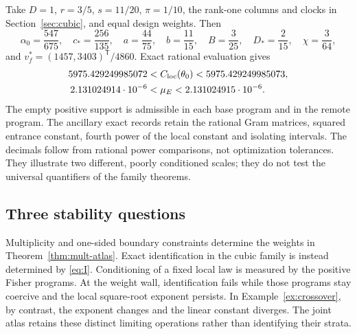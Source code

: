 \begin{example}\label{ex:wall-exact}
Take $D=1$, $r=3/5$, $s=11/20$, $\pi=1/10$, the rank-one columns and
clocks in Section~\ref{sec:cubic}, and equal design weights. Then
\[
 \alpha_0=\frac{547}{675},\quad c_*=\frac{256}{135},\quad
 a=\frac{44}{75},\quad b=\frac{11}{15},\quad
 B=\frac3{25},\quad D_*=\frac2{15},\quad\chi=\frac3{64},
\]
and $v_f^*=(1457,3403)^{\mathsf T}/4860$. Exact rational evaluation gives
\begin{align*}
 5975.429249985072&<C_{\mathrm{loc}}(\theta_0)<5975.429249985073,\\
 2.131024914\cdot10^{-6}&<\mu_E<2.131024915\cdot10^{-6}.
\end{align*}
The empty positive support is admissible in each base program and in
the remote program. The ancillary exact records retain the rational
Gram matrices, squared entrance constant, fourth power of the local
constant and isolating intervals. The decimals follow from rational
power comparisons, not optimization tolerances. They illustrate two
different, poorly conditioned scales; they do not test the universal
quantifiers of the family theorems.
\end{example}

\subsection*{Three stability questions}
Multiplicity and one-sided boundary constraints determine the weights
in Theorem~\ref{thm:mult-atlas}. Exact identification in the cubic family
is instead determined by \eqref{eq:I}. Conditioning of a fixed local
law is measured by the positive Fisher programs. At the weight wall,
identification fails while those programs stay coercive and the local
square-root exponent persists. In Example~\ref{ex:crossover}, by
contrast, the exponent changes and the linear constant diverges.
The joint atlas retains these distinct limiting operations rather than
identifying their strata.
